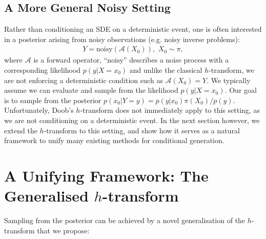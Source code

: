 \subsection{A More General Noisy Setting}

Rather than conditioning an SDE on a deterministic event, one is often interested in a posterior arising from noisy observations (e.g. noisy inverse problems):
\begin{align}
    Y = \text{noisy}(\mathcal{A}(X_0)), \,\, X_0 \sim \pi,
\end{align}
where $\mathcal{A}$ is a forward operator, ``$\text{noisy}$'' describes a noise process with a corresponding likelihood $p(y | X = x_0)$ and unlike the classical $h$-transform, we are not enforcing a deterministic condition such as $\mathcal{A}(X_0) = Y$. We typically assume we can evaluate and sample from the likelihood $p(y | X = x_0)$. Our goal is to sample from the posterior $p(x_0 | Y = y) = p(y | x_0) \pi(X_0) / p(y)$. Unfortunately, Doob's $h$-transform does not immediately apply to this setting, as we are not conditioning on a deterministic event. In the next section however, we extend the $h$-transform to this setting, and show how it serves as a natural framework to unify many existing methods for conditional generation.

\section{A Unifying Framework: The Generalised \texorpdfstring{$h$}{h}-transform}
\label{sec:generalised_htrans}
Sampling from the posterior can be achieved by a novel generalisation of the $h$-transform that we propose:

